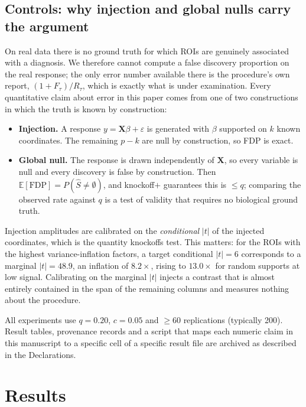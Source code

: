 \documentclass[11pt,a4paper]{article}
\newcommand{\X}{\mathbf{X}}
\newcommand{\E}{\mathbb{E}}
\newcommand{\FDP}{\mathrm{FDP}}
\begin{document}
\subsection{Controls: why injection and global nulls carry the argument}
\label{sec:controls}

On real data there is no ground truth for which ROIs are genuinely
associated with a diagnosis. We therefore cannot compute a false discovery
proportion on the real response; the only error number available there is
the procedure's own report, $(1+F_\tau)/R_\tau$, which is exactly what is
under examination. Every quantitative claim about error in this paper comes
from one of two constructions in which the truth is known by construction:

\begin{itemize}[leftmargin=1.5em,itemsep=2pt]
  \item \textbf{Injection.} A response $y=\X\beta+\varepsilon$ is generated
  with $\beta$ supported on $k$ known coordinates. The remaining $p-k$ are
  null by construction, so FDP is exact.
  \item \textbf{Global null.} The response is drawn independently of $\X$, so
  every variable is null and every discovery is false by construction. Then
  $\E[\FDP]=P(\hat S\ne\emptyset)$, and knockoff$+$ guarantees this is
  $\le q$; comparing the observed rate against $q$ is a test of validity
  that requires no biological ground truth.
\end{itemize}

\noindent
Injection amplitudes are calibrated on the \emph{conditional} $|t|$ of the
injected coordinates, which is the quantity knockoffs test. This matters:
for the ROIs with the highest variance-inflation factors, a target
conditional $|t|=6$ corresponds to a marginal $|t|=48.9$, an inflation of
$8.2\times$, rising to $13.0\times$ for random supports at low signal.
Calibrating on the marginal $|t|$ injects a contrast that is almost entirely
contained in the span of the remaining columns and measures nothing about
the procedure.

All experiments use $q=0.20$, $c=0.05$ and $\ge60$ replications (typically
200). Result tables, provenance records and a script that maps each numeric
claim in this manuscript to a specific cell of a specific result file are
archived as described in the Declarations.

\section{Results}
\label{sec:results}
\end{document}
